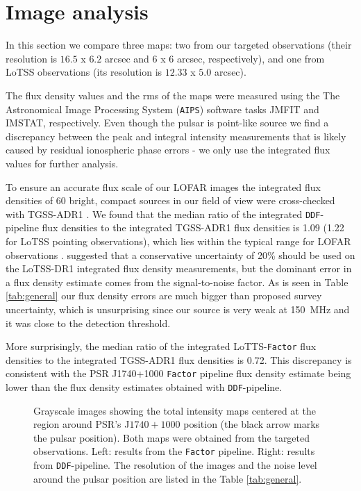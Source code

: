\documentclass[manuscript]{aastex63}
\begin{document}
\section{Image analysis}
In this section we compare three maps: two from our targeted observations (their resolution is $16.5$ x $6.2$ arcsec and $6$ x $6 $ arcsec, respectively), and one from LoTSS observations (its resolution is $12.33$ x $5.0$ arcsec). 

The flux density values and the rms of the maps were measured using the The Astronomical Image Processing System (\texttt{AIPS}) software tasks JMFIT and IMSTAT, respectively. Even though the pulsar is point-like source we find a discrepancy between the peak and integral intensity measurements that is likely caused by residual ionospheric phase errors \citep{2017Shimwell} - we only use the integrated flux values for further analysis. 

To ensure an accurate flux scale of our LOFAR images the integrated flux densities of 60 bright, compact sources in our field of view were cross-checked with TGSS-ADR1 \citep{2017Intema}. We found that the median ratio of the integrated \texttt{DDF}-pipeline flux densities to the integrated TGSS-ADR1 flux densities is 1.09 (1.22 for LoTSS pointing observations), which lies within the typical range for LOFAR observations \citep[see, e.g][]{2019Shimwell}. \citealt{2019Shimwell} suggested that a conservative uncertainty of 20\% should be used on the LoTSS-DR1 integrated flux density measurements, but the dominant error in a flux density estimate comes from the signal-to-noise factor. As is seen in Table \ref{tab:general} our flux density errors are much bigger than proposed survey uncertainty, which is unsurprising since our source is very weak at 150~MHz and it was close to the detection threshold.

More surprisingly, the median ratio of the integrated LoTTS-\texttt{Factor} flux densities to the integrated TGSS-ADR1 flux densities is 0.72. This discrepancy is consistent with the PSR J1740+1000 \texttt{Factor} pipeline flux density estimate being lower than the flux density estimates obtained with \texttt{DDF}-pipeline. 

\begin{figure}[ht!]
\caption{Grayscale images showing the total intensity maps centered at the region around PSR's J$1740+1000$ position (the black arrow marks the pulsar position). Both maps were obtained from the targeted observations. Left: results from the \texttt{Factor} pipeline. Right: results from \texttt{DDF}-pipeline. The resolution of the images and the noise level around the pulsar position are listed in the Table \ref{tab:general}.   \label{fig:targeted_maps}}
\end{figure}
\end{document}
